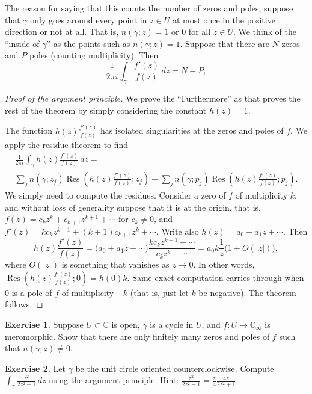 \documentclass[12pt,openany]{book}
\newcommand{\sabs}[1]{\lvert {#1} \rvert}
\newcommand{\C}{{\mathbb{C}}}
\theoremstyle{plain}
\theoremstyle{remark}
\theoremstyle{definition}
\newenvironment{exbox}{%
    \def\FrameCommand{\vrule width 1pt \relax\hspace {10pt}}%
    \MakeFramed {\advance \hsize -\width \FrameRestore }%
}{%
    \endMakeFramed
}
\theoremstyle{exercise}
\newtheorem{exercise}{Exercise}[section]
\theoremstyle{example}
\begin{document}
The reason for saying that this counts the number of zeros and poles,
suppose that $\gamma$ only goes around every point in $z \in U$ at most once
in the positive direction or not at all.  That is,
$n(\gamma;z) = 1$ or $0$ for all $z \in U$.  We think of the ``inside of
$\gamma$'' as the points such as $n(\gamma;z)=1$.  Suppose that there are
$N$ zeros and $P$ poles (counting multiplicity).  Then
\begin{equation*}
\frac{1}{2\pi i}
\int_\gamma \frac{f'(z)}{f(z)} \, dz
= N - P ,
\end{equation*}

\begin{proof}[Proof of the argument principle]
We prove the ``Furthermore'' as that proves the rest of the theorem by
simply considering the constant $h(z) = 1$.

The function $h(z) \frac{f'(z)}{f(z)}$ has isolated singularities
at the zeros and poles of $f$.  We apply the residue theorem to find
\begin{multline*}
\frac{1}{2\pi i}
\int_\gamma h(z) \frac{f'(z)}{f(z)} \, dz
=
\\
\sum_{j} n(\gamma;z_j)\operatorname{Res}\left(h(z)
\frac{f'(z)}{f(z)};z_j\right)
-
\sum_{j} n(\gamma;p_j)\operatorname{Res}\left(h(z)
\frac{f'(z)}{f(z)};p_j\right) .
\end{multline*}
We simply need to compute the residues.  Consider a zero of $f$ of
multiplicity $k$, and
without loss of generality suppose that it is at the origin,
that is, $f(z) = c_k z^k + c_{k+1} z^{k+1} + \cdots$ for $c_k \not= 0$, and 
$f'(z) = k c_k z^{k-1} + (k+1)c_{k+1} z^{k} + \cdots$.
Write also $h(z) = a_0 + a_1 z + \cdots$.  Then
\begin{equation*}
h(z)
\frac{f'(z)}{f(z)}
=
\bigl(
a_0 + a_1 z + \cdots
\bigr)
\frac{k c_k z^{k-1} + \cdots}{c_k z^k + \cdots}
=
a_0 k \frac{1}{z} \bigl( 1 + O(\sabs{z}) \bigr) ,
\end{equation*}
where $O(\sabs{z})$ is something that vanishes as $z \to 0$.
In other words, $\operatorname{Res}\left(h(z)
\frac{f'(z)}{f(z)};0\right) = h(0) k$.
Same exact computation carries through when $0$ is a pole of $f$
of multiplicity $-k$ (that is, just let $k$ be negative).
The theorem follows.
\end{proof}

\begin{exbox}
\begin{exercise}
Suppose $U \subset \C$ is open, $\gamma$ is a cycle in $U$,
and $f \colon U \to \C_\infty$ is meromorphic.
Show that there are only finitely many zeros and poles of $f$
such that $n(\gamma;z) \not= 0$.
\end{exercise}

\begin{exercise}
Let $\gamma$ be the unit circle oriented counterclockwise.
Compute $\int_\gamma \frac{z^2}{2 z^2+1} \, dz$ using the argument
principle.  Hint: $\frac{z^2}{2 z^2+1}=\frac{z}{4} \frac{4z}{2z^2+1}$.
\end{exercise}
\end{exbox}
\end{document}
